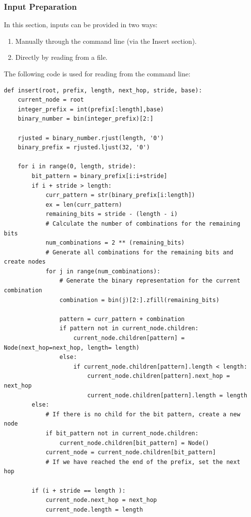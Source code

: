 \documentclass[12pt	]{article}
\begin{document}
\subsubsection{Input Preparation}
In this section, inputs can be provided in two ways:
\begin{enumerate}
	\item Manually through the command line (via the Insert section).
	\item Directly by reading from a file.
\end{enumerate}


The following code is used for reading from the command line:

\begin{lstlisting}[style=pythonstyle, caption={Insert Command}]
def insert(root, prefix, length, next_hop, stride, base):
	current_node = root  
	integer_prefix = int(prefix[:length],base)
	binary_number = bin(integer_prefix)[2:]
	
	rjusted = binary_number.rjust(length, '0')
	binary_prefix = rjusted.ljust(32, '0')
	
	for i in range(0, length, stride):
		bit_pattern = binary_prefix[i:i+stride]
		if i + stride > length:
			curr_pattern = str(binary_prefix[i:length]) 
			ex = len(curr_pattern)
			remaining_bits = stride - (length - i)
			# Calculate the number of combinations for the remaining bits
			num_combinations = 2 ** (remaining_bits)
			# Generate all combinations for the remaining bits and create nodes
			for j in range(num_combinations):
				# Generate the binary representation for the current combination
				combination = bin(j)[2:].zfill(remaining_bits)
				
				pattern = curr_pattern + combination 
				if pattern not in current_node.children:
					current_node.children[pattern] = Node(next_hop=next_hop, length= length)
				else:
					if current_node.children[pattern].length < length:
						current_node.children[pattern].next_hop = next_hop
						current_node.children[pattern].length = length
		else:
			# If there is no child for the bit pattern, create a new node
			if bit_pattern not in current_node.children:
				current_node.children[bit_pattern] = Node()
			current_node = current_node.children[bit_pattern]
			# If we have reached the end of the prefix, set the next hop
			
		if (i + stride == length ):
			current_node.next_hop = next_hop
			current_node.length = length
\end{lstlisting}
\end{document}
